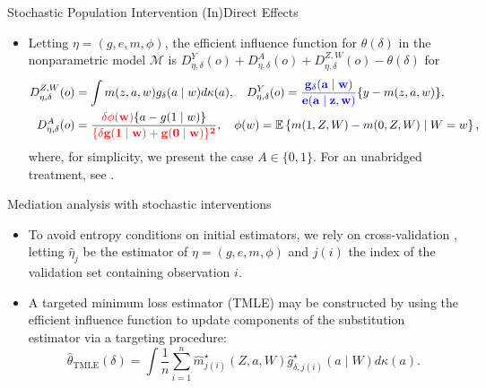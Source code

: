 \documentclass{beamer}
\begin{document}
\begin{frame}[c]{Stochastic Population Intervention (In)Direct Effects}

\begin{center}
\begin{itemize}
\itemsep0.25pt
\item Letting $\eta = (g, e, m, \phi)$, the efficient influence function for
  $\theta(\delta)$ in the nonparametric model $\mathcal{M}$ is
  $D^Y_{\eta, \delta}(o) + D^A_{\eta, \delta}(o) + D^{Z, W}_{\eta, \delta}(o) -
  \theta(\delta)$ for
  \vspace{-0.5em}
  \begin{align*}
    D^{Z, W}_{\eta, \delta}(o) &= \int m(z, a, w) g_{\delta}(a \mid w)
      d\kappa(a),
    \quad
    D^Y_{\eta, \delta}(o) = \mathbf{\textcolor{blue}{\frac{g_{\delta}(a \mid w)}
      {e(a \mid z, w)}}} \{y - m(z,a,w) \},\\
    D^A_{\eta,\delta}(o) &= \frac{\mathbf{\textcolor{red}{\delta\phi(w)}}\{a -
      g(1 \mid w)\}}{\mathbf{\textcolor{red}{\{\delta g(1 \mid w) +
      g(0 \mid w)\}^2}}},
    \quad
    \phi(w) = \mathbb{E}\left\{m(1, Z, W) - m(0, Z, W) \mid W = w \right\},
  \end{align*}
  where, for simplicity, we present the case $A \in \{0, 1\}$. For an unabridged
  treatment, see \cite{diaz2019causal}.
\end{itemize}
\end{center}

\note{
}

\end{frame}


\begin{frame}[c]{Mediation analysis with stochastic interventions}

\begin{center}
\begin{itemize}
  \item To avoid entropy conditions on initial estimators, we rely on
    cross-validation \citep{zheng2011cross, chernozhukov2016double}, letting
    $\hat{\eta}_{j}$ be the estimator of $\eta = (g, e, m, \phi)$ and $j(i)$ the
    index of the validation set containing observation $i$.
  \item A targeted minimum loss estimator (TMLE) may be constructed by using the
    efficient influence function to update components of the substitution
    estimator via a targeting procedure:
    \begin{equation*}
      \hat{\theta}_{\text{TMLE}}(\delta) = \int \frac{1}{n} \sum_{i=1}^n
      \hat{m}^{\star}_{j(i)}(Z, a, W)
      \hat{g}_{\delta, j(i)}^{\star}(a \mid W) d\kappa(a).
    \end{equation*}
\end{itemize}
\end{center}

\note{
}

\end{frame}
\end{document}
